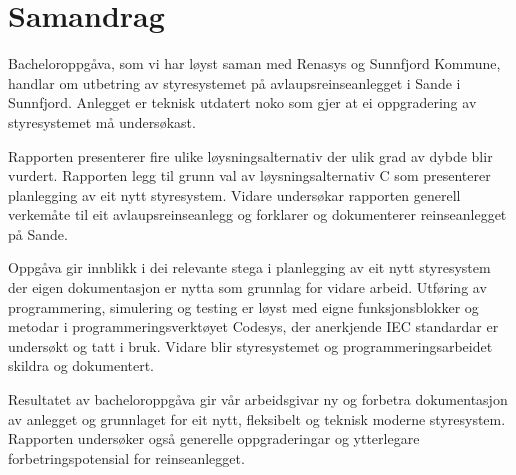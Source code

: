 \chapter{Samandrag}
\thispagestyle{romanpages}

Bacheloroppgåva, som vi har løyst saman med \gls{Renasys} og \gls{Sunnfjord Kommune}, handlar om utbetring av styresystemet på 
avlaupsreinseanlegget i Sande i Sunnfjord. 
Anlegget er teknisk utdatert noko som gjer at ei oppgradering av styresystemet må undersøkast.

Rapporten presenterer fire ulike løysningsalternativ
der ulik grad av dybde blir vurdert. \newline
Rapporten legg til grunn val av løysningsalternativ C som presenterer planlegging av eit nytt styresystem.
Vidare undersøkar rapporten generell verkemåte til eit avlaupsreinseanlegg og forklarer og dokumenterer reinseanlegget på Sande.

Oppgåva gir innblikk i dei relevante stega i planlegging av eit nytt styresystem der eigen dokumentasjon er nytta som grunnlag for vidare arbeid. 
Utføring av programmering, simulering og testing er løyst med eigne funksjonsblokker og metodar i programmeringsverktøyet \gls{Codesys},
der anerkjende \gls{IEC} standardar er undersøkt og tatt i bruk.
Vidare blir styresystemet og programmeringsarbeidet skildra og dokumentert.

Resultatet av bacheloroppgåva gir vår arbeidsgivar ny og forbetra dokumentasjon av anlegget 
og grunnlaget for eit nytt, fleksibelt og teknisk moderne styresystem. 
Rapporten undersøker også generelle oppgraderingar og ytterlegare forbetringspotensial for reinseanlegget.